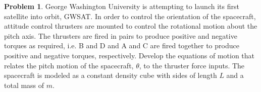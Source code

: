 \documentclass[10pt]{article}
\theoremstyle{definition}
\newtheorem{prob}{Problem}[section]
\begin{document}
\begin{prob}
    George Washington University is attempting to launch its first satellite into orbit, GWSAT.
    In order to control the orientation of the spacecraft, attitude control thrusters are mounted to control the rotational motion about the pitch axis.
    The thrusters are fired in pairs to produce positive and negative torques as required, i.e. B and D and A and C are fired together to produce positive and negative torques, respectively.
    Develop the equations of motion that relates the pitch motion of the spacecraft, \( \theta \), to the thruster force inputs.
    The spacecraft is modeled as a constant density cube with sides of length \( L \) and a total mass of \( m \).
    \begin{figure}[h]
        \centering
        \begin{scaletikzpicturetowidth}{0.4\textwidth}
\end{scaletikzpicturetowidth}
\end{figure}
\end{prob}
\end{document}
